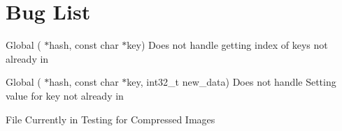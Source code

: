 \chapter{Bug List}
\hypertarget{bug}{}\label{bug}

\begin{DoxyRefList}
\item[Global \doxylink{hash__table_8h_a27578c1b5a3ab68d8f144ed86ea72cc2}{Hash\+\_\+\+Get\+Value} (\doxylink{struct_hash_table}{Hash\+Table} \texorpdfstring{$\ast$}{*}hash, const char \texorpdfstring{$\ast$}{*}key)]\label{bug__bug000001}%
%
Does not handle getting index of keys not already in   
\item[Global \doxylink{hash__table_8h_a3895b9b37a2ed859af17b8d22e06bab0}{Hash\+\_\+\+Set\+Value} (\doxylink{struct_hash_table}{Hash\+Table} \texorpdfstring{$\ast$}{*}hash, const char \texorpdfstring{$\ast$}{*}key, int32\+\_\+t new\+\_\+data)]\label{bug__bug000002}%
%
Does not handle Setting value for key not already in   
\item[File \doxylink{var_int_file___i_o_8h}{var\+Int\+File\+\_\+\+IO.h} ]\label{bug__bug000003}%
%
Currently in Testing for Compressed Images 
\end{DoxyRefList}